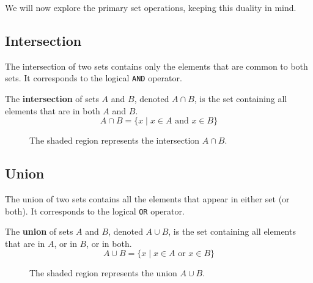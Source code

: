 We will now explore the primary set operations, keeping this duality in mind.

\subsection*{Intersection}
The intersection of two sets contains only the elements that are common to both sets. It corresponds to the logical \texttt{AND} operator.

\begin{definition}[Intersection]
    The \textbf{intersection} of sets $A$ and $B$, denoted $A \cap B$, is the set containing all elements that are in both $A$ and $B$.
    \[ A \cap B = \{ x \mid x \in A \text{ and } x \in B \} \]
\end{definition}

\begin{figure}[htbp]
    \centering
    \caption{The shaded region represents the intersection $A \cap B$.}
    \label{fig:intersection_custom}
\end{figure}

\subsection*{Union}
The union of two sets contains all the elements that appear in either set (or both). It corresponds to the logical \texttt{OR} operator.

\begin{definition}[Union]
    The \textbf{union} of sets $A$ and $B$, denoted $A \cup B$, is the set containing all elements that are in $A$, or in $B$, or in both.
    \[ A \cup B = \{ x \mid x \in A \text{ or } x \in B \} \]
\end{definition}

\begin{figure}[htbp]
    \centering
    \caption{The shaded region represents the union $A \cup B$.}
    \label{fig:union_custom}
\end{figure}

